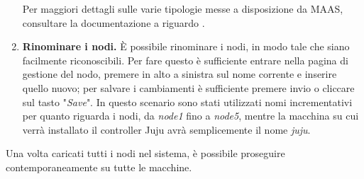 \begin{enumerate}
    Per maggiori dettagli sulle varie tipologie messe a disposizione da MAAS, consultare la documentazione a riguardo \cite{maas_power_management}.

    \item \textbf{Rinominare i nodi.} È possibile rinominare i nodi, in modo tale che siano facilmente riconoscibili. Per fare questo è sufficiente entrare nella pagina di gestione del nodo, premere in alto a sinistra sul nome corrente e inserire quello nuovo; per salvare i cambiamenti è sufficiente premere invio o cliccare sul tasto "\emph{Save}".
    In questo scenario sono stati utilizzati nomi incrementativi per quanto riguarda i nodi, da \emph{node1} fino a \emph{node5}, mentre la macchina su cui verrà installato il controller Juju avrà semplicemente il nome \emph{juju}.

\end{enumerate}
Una volta caricati tutti i nodi nel sistema, è possibile proseguire contemporaneamente su tutte le macchine.
